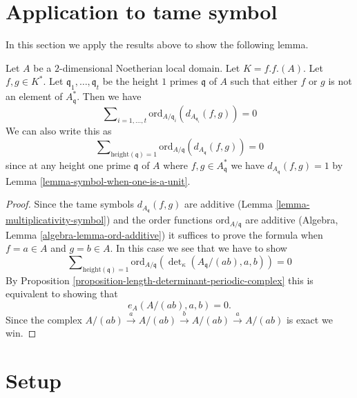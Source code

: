 \section{Application to tame symbol}
\label{section-application-tame-symbol}

\noindent
In this section we apply the results above to show
the following lemma.

\begin{lemma}
\label{lemma-secondary-ramification}
Let $A$ be a $2$-dimensional Noetherian local domain.
Let $K = f.f.(A)$. Let $f, g \in K^*$.
Let $\mathfrak q_1, \ldots, \mathfrak q_t$ be the height
$1$ primes $\mathfrak q$ of $A$ such that either $f$ or $g$ is not an
element of $A^*_{\mathfrak q}$.
Then we have
$$
\sum\nolimits_{i = 1, \ldots, t}
\text{ord}_{A/\mathfrak q_i}(d_{A_{\mathfrak q_i}}(f, g))
=
0
$$
We can also write this as
$$
\sum\nolimits_{\text{height}(\mathfrak q) = 1}
\text{ord}_{A/\mathfrak q}(d_{A_{\mathfrak q}}(f, g))
=
0
$$
since at any height one prime $\mathfrak q$
of $A$ where $f, g \in A^*_{\mathfrak q}$
we have $d_{A_{\mathfrak q}}(f, g) = 1$ by
Lemma \ref{lemma-symbol-when-one-is-a-unit}.
\end{lemma}

\begin{proof}
Since the tame symbols $d_{A_{\mathfrak q}}(f, g)$ are additive
(Lemma \ref{lemma-multiplicativity-symbol}) and the order
functions $\text{ord}_{A/\mathfrak q}$
are additive (Algebra, Lemma \ref{algebra-lemma-ord-additive})
it suffices to prove the formula when $f = a \in A$ and
$g = b \in A$. In this case we see that we have to show
$$
\sum\nolimits_{\text{height}(\mathfrak q) = 1}
\text{ord}_{A/\mathfrak q}(\det\nolimits_\kappa(A_{\mathfrak q}/(ab), a, b))
= 0
$$
By Proposition \ref{proposition-length-determinant-periodic-complex}
this is equivalent to showing that
$$
e_A(A/(ab), a, b) = 0.
$$
Since the complex
$A/(ab) \xrightarrow{a} A/(ab) \xrightarrow{b} A/(ab) \xrightarrow{a} A/(ab)$
is exact we win.
\end{proof}






















\section{Setup}
\label{section-setup}

